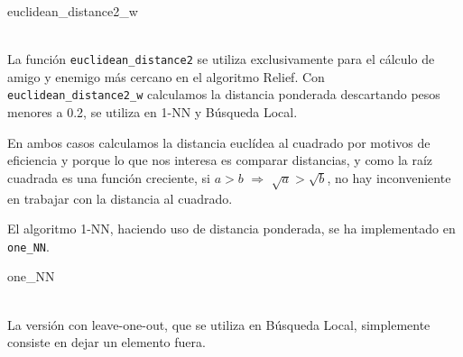 \documentclass[11pt,a4paper]{article}
\theoremstyle{definition}
\begin{document}
	\begin{algorithm}[H]
		\caption{euclidean\_distance2\_w}
	\end{algorithm}~\\
	
	La función \texttt{euclidean\_distance2}  se utiliza exclusivamente para el cálculo de amigo y enemigo más cercano en el algoritmo Relief. Con \texttt{euclidean\_distance2\_w} calculamos la distancia ponderada descartando pesos menores a 0.2, se utiliza en 1-NN y Búsqueda Local.
	
	En ambos casos calculamos la distancia euclídea al cuadrado por motivos de eficiencia y porque lo que nos interesa es comparar distancias, y como la raíz cuadrada es una función creciente, si $a>b$ $\Rightarrow $ $\sqrt{a}>\sqrt{b}$, no hay inconveniente en trabajar con la distancia al cuadrado.
	
	El algoritmo 1-NN, haciendo uso de distancia ponderada, se ha implementado en \texttt{one\_NN}.\\
	
	\begin{algorithm}[H]
		\caption{one\_NN}
	\end{algorithm}~\\
	
	La versión con leave-one-out, que se utiliza en Búsqueda Local, simplemente consiste en dejar un elemento fuera. \\
	
\end{document}
